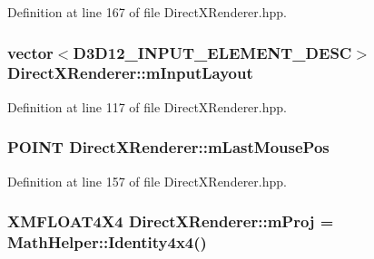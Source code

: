 Definition at line 167 of file Direct\+X\+Renderer.\+hpp.

\subsubsection[{\texorpdfstring{m\+Input\+Layout}{mInputLayout}}]{\setlength{\rightskip}{0pt plus 5cm}vector$<$D3\+D12\+\_\+\+I\+N\+P\+U\+T\+\_\+\+E\+L\+E\+M\+E\+N\+T\+\_\+\+D\+E\+SC$>$ Direct\+X\+Renderer\+::m\+Input\+Layout\hspace{0.3cm}{\ttfamily [protected]}}\hypertarget{class_direct_x_renderer_a9e2123f281f20c29d3d4c40bdf3246b1_a9e2123f281f20c29d3d4c40bdf3246b1}{}\label{class_direct_x_renderer_a9e2123f281f20c29d3d4c40bdf3246b1_a9e2123f281f20c29d3d4c40bdf3246b1}


Definition at line 117 of file Direct\+X\+Renderer.\+hpp.

\subsubsection[{\texorpdfstring{m\+Last\+Mouse\+Pos}{mLastMousePos}}]{\setlength{\rightskip}{0pt plus 5cm}P\+O\+I\+NT Direct\+X\+Renderer\+::m\+Last\+Mouse\+Pos\hspace{0.3cm}{\ttfamily [protected]}}\hypertarget{class_direct_x_renderer_a11a4b47ed4a944b8671ccbda8698780a_a11a4b47ed4a944b8671ccbda8698780a}{}\label{class_direct_x_renderer_a11a4b47ed4a944b8671ccbda8698780a_a11a4b47ed4a944b8671ccbda8698780a}


Definition at line 157 of file Direct\+X\+Renderer.\+hpp.

\subsubsection[{\texorpdfstring{m\+Proj}{mProj}}]{\setlength{\rightskip}{0pt plus 5cm}X\+M\+F\+L\+O\+A\+T4\+X4 Direct\+X\+Renderer\+::m\+Proj = {\bf Math\+Helper\+::\+Identity4x4}()\hspace{0.3cm}{\ttfamily [protected]}}\hypertarget{class_direct_x_renderer_abebffe15f62df95af83a3d10b1fb4ee8_abebffe15f62df95af83a3d10b1fb4ee8}{}\label{class_direct_x_renderer_abebffe15f62df95af83a3d10b1fb4ee8_abebffe15f62df95af83a3d10b1fb4ee8}


